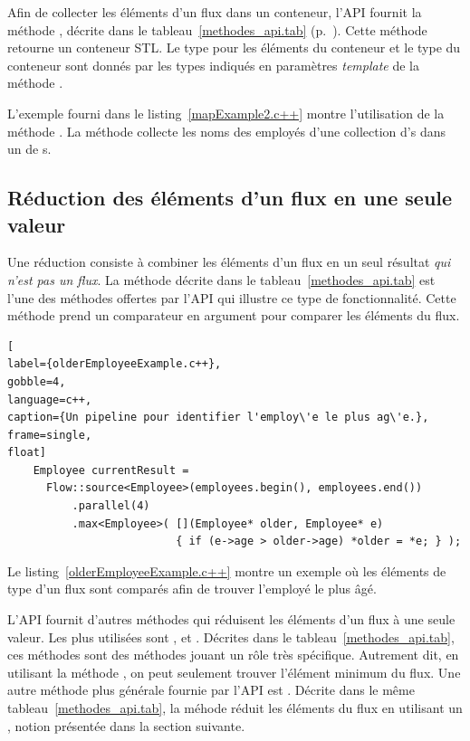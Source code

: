 Afin de collecter les \'el\'ements d'un flux dans un conteneur, l'{API} fournit la m\'ethode , d\'ecrite dans le tableau~\ref{methodes_api.tab} (p.~\pageref{collector.page}). Cette m\'ethode retourne un conteneur {STL}. Le type pour les \'el\'ements du conteneur et le type du conteneur sont donn\'es par les types indiqu\'es en param\`etres \emph{template} de la m\'ethode . 

L'exemple fourni dans le listing~\ref{mapExample2.c++} montre l'utilisation de la m\'ethode . La m\'ethode collecte les noms des employ\'es d'une collection d's dans un  de s.


\subsection{R\'eduction des \'el\'ements d'un flux en une seule valeur}

Une r\'eduction
consiste \`a combiner les \'el\'ements d'un flux en un seul r\'esultat \emph{qui n'est pas un flux}. La m\'ethode  d\'ecrite dans le tableau~\ref{methodes_api.tab} est l'une des m\'ethodes offertes par l'{API} qui illustre ce type de fonctionnalit\'e. Cette m\'ethode prend un comparateur en argument pour comparer les \'el\'ements du flux. 

\begin{lstlisting}[
label={olderEmployeeExample.c++},
gobble=4,
language=c++,
caption={Un pipeline pour identifier l'employ\'e le plus ag\'e.},
frame=single,
float]
    Employee currentResult = 
      Flow::source<Employee>(employees.begin(), employees.end())
          .parallel(4)
          .max<Employee>( [](Employee* older, Employee* e) 
                          { if (e->age > older->age) *older = *e; } );
\end{lstlisting}



Le listing~\ref{olderEmployeeExample.c++} montre un exemple o\`u les \'el\'ements de type  d'un flux sont compar\'es afin de trouver l'employ\'e le plus \^ag\'e.


L'{API} fournit d'autres m\'ethodes qui r\'eduisent les \'el\'ements d'un flux \`a une seule valeur. Les plus utilis\'ees sont ,  et . D\'ecrites dans le tableau~\ref{methodes_api.tab}, ces m\'ethodes sont des m\'ethodes jouant un r\^ole tr\`es sp\'ecifique. Autrement dit, en utilisant la m\'ethode , on peut seulement trouver l'\'el\'ement minimum du flux. Une autre m\'ethode plus g\'en\'erale fournie par l'{API} est . D\'ecrite dans le m\^eme tableau~\ref{methodes_api.tab}, la m\'ehode  r\'eduit les \'el\'ements du flux en utilisant un , notion pr\'esent\'ee dans la section suivante.






